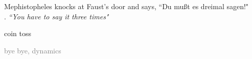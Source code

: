 \begin{frame}{}
\begin{bartlett}{
Mephistopheles knocks at Faust's door and says, ``Du
mu{\ss}t es dreimal sagen!"
\\{\color{yellow}.}\qquad
{\scriptsize\emph{``You have to say it three times"}}
        }
\end{bartlett}
\vfill
\begin{enumerate}
              \item {\Large
coin toss
                  }\textcolor{gray}{\small
              \item
\templatt
              \item
\catlatt
              \item
bye bye, dynamics
                    }
            \end{enumerate}
\end{frame}

\renewcommand{\statesp}{state space}
\renewcommand{\ssp}{\ensuremath{x}}               %

